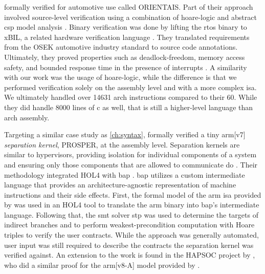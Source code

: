 \Textcite{shi2012orientais} formally verified  for automotive use
called ORIENTAIS.
Part of their approach involved source-level verification
using a combination of \gls{hoare-logic}
and abstract \ac{csp} model analysis \autocite{hoare1978csp}.
Binary verification was done by lifting the \ac{rtos} binary to xBIL,
a related hardware verification language \autocite{shi2012xbil}.
They translated requirements from the OSEK automotive industry standard
to source code annotations.
Ultimately, they proved properties such as deadlock-freedom, memory access safety,
and bounded response time in the presence of interrupts \autocite{shi2012interrupt}.
A similarity with our work was the usage of \gls{hoare-logic},
while the difference is that we performed verification solely on the assembly level
and with a more complex \ac{isa}.
We ultimately handled over \num{14631} \gls{arch} instructions compared to their \num{60}.
While they did handle \num{8000} lines of \gls{c} as well,
that is still a higher-level language than \gls{arch} assembly.

Targeting a similar case study as \cref{ch:syntax},
\textcite{dam2013hypervisor,dam2013formal}
formally verified a tiny \gls{arm}[v7] \emph{separation kernel},%
PROSPER, at the assembly level.
Separation kernels are similar to hypervisors,
providing isolation for individual components of a system and ensuring
only those components that are allowed to communicate do \autocite{rushby1981dvss}.
Their methodology integrated HOL4 with \ac{bap} \autocite{brumley2011bap}.
\Ac{bap} utilizes a custom intermediate language
that provides an architecture-agnostic representation of machine instructions
and their side effects.
First, the formal model of the \gls{arm} \ac{isa} provided by \textcite{fox2010arm} was used
in an HOL4 tool to translate the \gls{arm} binary into \ac{bap}'s intermediate language.
Following that, the \ac{smt} solver \ac{stp}  \autocite{ganesh2007stp}
was used to determine the targets of indirect branches
and to perform weakest-precondition computation with Hoare triples
to verify the user contracts.
While the approach was generally automated,
user input was still required to describe the contracts
the separation kernel was verified against.
An extension to the work is found in the HAPSOC project by \textcite{baumann2016high},
who did a similar proof for the \gls{arm}[v8-A] model provided by \textcite{fox2015improved}.

